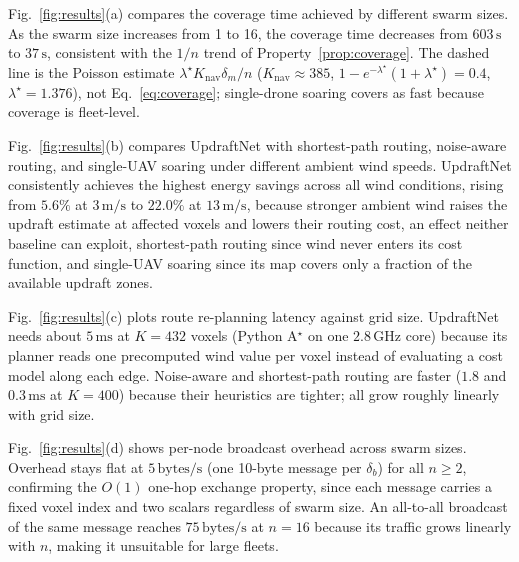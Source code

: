 \documentclass[conference]{IEEEtran}
\newcommand{\rd}[1]{#1}   %
\begin{document}
Fig.~\ref{fig:results}(a) compares the coverage time achieved by different
swarm sizes. As the swarm size increases from 1 to 16, the
coverage time decreases from \rd{$603\,\text{s}$} to \rd{$37\,\text{s}$}, \rd{consistent with the $1/n$ trend of} Property~\ref{prop:coverage}.
\rd{The dashed line is the Poisson estimate $\lambda^\star K_{\mathrm{nav}}\delta_m/n$ ($K_{\mathrm{nav}}\approx385$, $1-e^{-\lambda^\star}(1+\lambda^\star)=0.4$, $\lambda^\star=1.376$), not Eq.~\eqref{eq:coverage};
single-drone soaring covers as fast because coverage is fleet-level.}

Fig.~\ref{fig:results}(b) compares UpdraftNet with shortest-path routing,
noise-aware routing, and single-UAV soaring under different
ambient wind speeds. UpdraftNet consistently achieves the
highest energy savings across all wind conditions\rd{, rising from $5.6\%$ at $3\,\text{m/s}$ to $22.0\%$ at $13\,\text{m/s}$,} because
stronger ambient wind raises the updraft estimate at affected
voxels and lowers their routing cost, an effect neither baseline
can exploit, shortest-path routing since wind never enters its
cost function, and single-UAV soaring since its map covers
only a fraction of the available updraft zones.

Fig.~\ref{fig:results}(c) plots route re-planning latency against grid size.
UpdraftNet \rd{needs about} $5\,\text{ms}$ at $K=432$ voxels \rd{(Python A$^\star$ on one $2.8\,\text{GHz}$ core)} because its
planner reads one precomputed wind value per voxel instead
of evaluating a cost model along each edge. \rd{Noise-aware and shortest-path routing are faster ($1.8$ and $0.3\,\text{ms}$ at $K=400$) because their heuristics are tighter; all grow roughly linearly with grid size.}

Fig.~\ref{fig:results}(d) shows per-node broadcast overhead across swarm
sizes. Overhead stays flat at \rd{$5\,\text{bytes/s}$ (one 10-byte message per $\delta_b$)} for all \rd{$n\ge2$}, confirming
the $O(1)$ \rd{one-hop exchange} property, since each \rd{message} carries a fixed
voxel index and two scalars regardless of swarm size. \rd{An all-to-all broadcast of the same message}
\rd{reaches $75\,\text{bytes/s}$ at $n=16$ because its traffic grows linearly with $n$}, making it unsuitable for large fleets.
\end{document}
